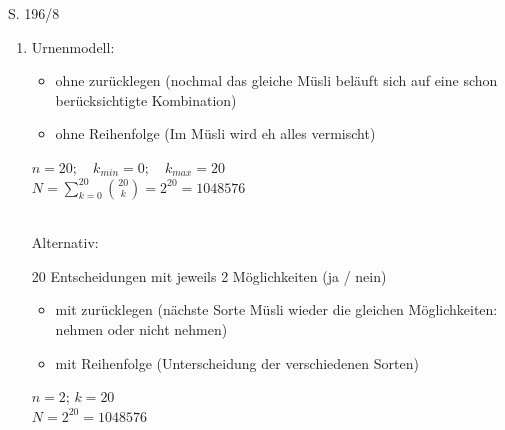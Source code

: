 \begin{Exercise}{S. 196/8}{}
\begin{enumerate}[leftmargin=*]
    \item [8.]{
        Urnenmodell: \quad \begin{minipage}[t]{0.75\linewidth}
            \begin{itemize}[leftmargin=*]
                \item ohne zurücklegen (nochmal das gleiche Müsli beläuft sich auf eine schon berücksichtigte Kombination)
                \item ohne Reihenfolge (Im Müsli wird eh alles vermischt)
            \end{itemize}
            $n = 20; \quad k_{min} = 0; \quad k_{max} = 20$\\[1.5ex]
            $N = \displaystyle \sum_{k=0}^{20} \binom{20}{k} = 2^{20} = 1048576$\\
        \end{minipage}\\[1.0ex]
        Alternativ: \quad \begin{minipage}[t]{0.75\linewidth}
            20 Entscheidungen mit jeweils 2 Möglichkeiten (ja / nein)
            \begin{itemize}[leftmargin=*]
                \item mit zurücklegen (nächste Sorte Müsli wieder die gleichen Möglichkeiten: nehmen oder nicht nehmen)
                \item mit Reihenfolge (Unterscheidung der verschiedenen Sorten)
            \end{itemize}
            $n = 2$; \quad $k = 20$\\[1.5ex]
            $N = 2^{20} = 1048576$\\
        \end{minipage}
    }
\end{enumerate}
\end{Exercise}